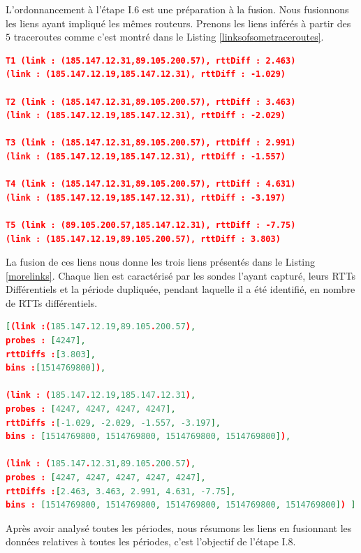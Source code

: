 L'ordonnancement à l'étape  I.6 est une préparation à la fusion. Nous fusionnons les liens ayant impliqué les mêmes routeurs. Prenons les liens inférés à partir des $5$ traceroutes  comme c'est montré dans le Listing \ref{linksofsometraceroutes}.

\begin{lstlisting}[language=json,firstnumber=1, caption={Liste des liens possibles inférés via  les traceroutes T1, T2, T3, T4 et T5}, basicstyle = \footnotesize, label=linksofsometraceroutes]
T1 (link : (185.147.12.31,89.105.200.57), rttDiff : 2.463)
(link : (185.147.12.19,185.147.12.31), rttDiff : -1.029)

T2 (link : (185.147.12.31,89.105.200.57), rttDiff : 3.463) 
(link : (185.147.12.19,185.147.12.31), rttDiff : -2.029)

T3 (link : (185.147.12.31,89.105.200.57), rttDiff : 2.991) 
(link : (185.147.12.19,185.147.12.31), rttDiff : -1.557)

T4 (link : (185.147.12.31,89.105.200.57), rttDiff : 4.631) 
(link : (185.147.12.19,185.147.12.31), rttDiff : -3.197)

T5 (link : (89.105.200.57,185.147.12.31), rttDiff : -7.75) 
(link : (185.147.12.19,89.105.200.57), rttDiff : 3.803)
\end{lstlisting}

La fusion de ces liens nous donne les trois liens présentés dans le Listing \ref{morelinks}. Chaque lien est caractérisé par les sondes l'ayant capturé, leurs  RTTs Différentiels et la période dupliquée, pendant laquelle il a été identifié, en nombre de RTTs différentiels. 

\begin{lstlisting}[language=json,firstnumber=1, caption={Caractérisation des liens identifiés lors  de la période 1514769800 avec les traceroutes T1, T2, T3, T4 et T5}, basicstyle = \footnotesize, label =morelinks]
[(link :(185.147.12.19,89.105.200.57),
probes : [4247],
rttDiffs :[3.803],
bins :[1514769800]),

(link : (185.147.12.19,185.147.12.31),
probes : [4247, 4247, 4247, 4247],
rttDiffs :[-1.029, -2.029, -1.557, -3.197],
bins : [1514769800, 1514769800, 1514769800, 1514769800]),

(link : (185.147.12.31,89.105.200.57),
probes : [4247, 4247, 4247, 4247, 4247],
rttDiffs :[2.463, 3.463, 2.991, 4.631, -7.75],
bins : [1514769800, 1514769800, 1514769800, 1514769800, 1514769800]) ]
\end{lstlisting}

Après avoir analysé  toutes les périodes, nous résumons les liens en fusionnant les données relatives à toutes les périodes, c'est l'objectif de l'étape I.8.

